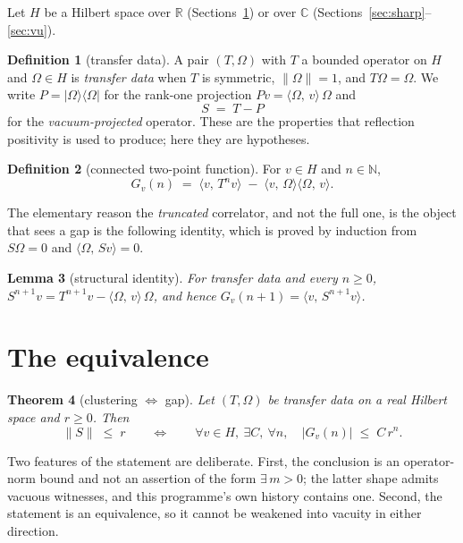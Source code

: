 \documentclass[11pt]{article}
\newtheorem{theorem}{Theorem}[section]
\newtheorem{lemma}[theorem]{Lemma}
\theoremstyle{definition}
\newtheorem{definition}[theorem]{Definition}
\newcommand{\R}{\mathbb{R}}
\newcommand{\C}{\mathbb{C}}
\newcommand{\Om}{\Omega}
\newcommand{\inn}[2]{\langle #1,\, #2\rangle}
\newcommand{\ket}[1]{|#1\rangle}
\newcommand{\bra}[1]{\langle #1|}
\begin{document}
Let $H$ be a Hilbert space over $\R$ (Sections~\ref{sec:equiv}) or over
$\C$ (Sections~\ref{sec:sharp}--\ref{sec:vu}).

\begin{definition}[transfer data]
\label{def:data}
A pair $(T,\Om)$ with $T$ a bounded operator on $H$ and $\Om \in H$ is
\emph{transfer data} when $T$ is symmetric, $\|\Om\| = 1$, and
$T\Om = \Om$.  We write $P = \ket{\Om}\bra{\Om}$ for the rank-one
projection $Pv = \inn{\Om}{v}\,\Om$ and
\[
  S \;=\; T - P
\]
for the \emph{vacuum-projected} operator.  These are the properties that
reflection positivity is used to produce; here they are hypotheses.
\end{definition}

\begin{definition}[connected two-point function]
\label{def:conn}
For $v \in H$ and $n \in \mathbb{N}$,
\[
  G_v(n) \;=\; \inn{v}{T^n v} \;-\; \inn{v}{\Om}\inn{\Om}{v}.
\]
\end{definition}

The elementary reason the \emph{truncated} correlator, and not the full
one, is the object that sees a gap is the following identity, which is
proved by induction from $S\Om = 0$ and $\inn{\Om}{Sv} = 0$.

\begin{lemma}[structural identity]
\label{lem:struct}
For transfer data and every $n \ge 0$,
$S^{n+1} v = T^{n+1} v - \inn{\Om}{v}\,\Om$, and hence
$G_v(n+1) = \inn{v}{S^{n+1} v}$.
\end{lemma}

\section{The equivalence}
\label{sec:equiv}

\begin{theorem}[clustering $\iff$ gap]
\label{thm:equiv}
Let $(T,\Om)$ be transfer data on a real Hilbert space and $r \ge 0$.
Then
\[
  \|S\| \;\le\; r
  \qquad\Longleftrightarrow\qquad
  \forall v \in H,\ \exists C,\ \forall n,\quad |G_v(n)| \;\le\; C\,r^n .
\]
\end{theorem}

Two features of the statement are deliberate.  First, the conclusion is
an operator-norm bound and not an assertion of the form
$\exists\,m > 0$; the latter shape admits vacuous witnesses, and this
programme's own history contains one.  Second, the statement is an
equivalence, so it cannot be weakened into vacuity in either direction.
\end{document}
